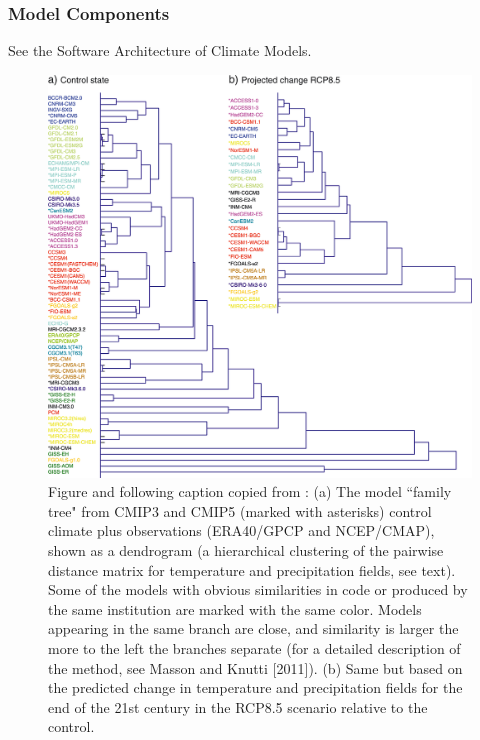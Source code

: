 \documentclass{article}
\begin{document}
\subsubsection{Model Components}
See the Software Architecture of Climate Models. 
\begin{figure}[h]
\includegraphics[width=\textwidth]{Knutti_family_tree.png}
\caption{Figure and following caption copied from \cite{knutti_climate_2013}: (a) The model ``family tree" from CMIP3 and CMIP5 (marked with asterisks) control climate plus observations (ERA40/GPCP and NCEP/CMAP), shown as a dendrogram (a hierarchical clustering of the pairwise distance matrix for temperature and precipitation fields, see text). Some of the models with obvious similarities in code or produced by the same institution are marked with the same color. Models appearing in the same branch are close, and similarity is larger the more to the left the branches separate (for a detailed description of the method, see Masson and Knutti [2011]). (b) Same but based on the predicted change in temperature and precipitation fields for the end of the 21st century in the RCP8.5 scenario relative to the control.}
\end{figure} 
\end{document}
